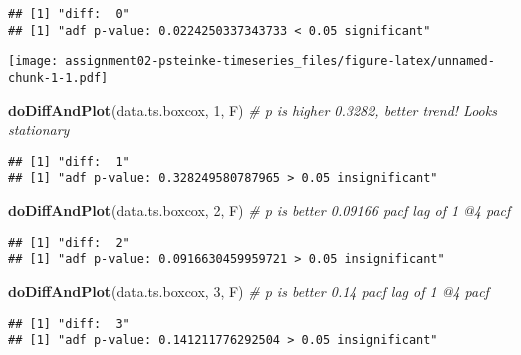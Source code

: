 \documentclass[]{article}
\newenvironment{Shaded}{\begin{snugshade}}{\end{snugshade}}
\newcommand{\CommentTok}[1]{\textcolor[rgb]{0.56,0.35,0.01}{\textit{#1}}}
\newcommand{\DecValTok}[1]{\textcolor[rgb]{0.00,0.00,0.81}{#1}}
\newcommand{\KeywordTok}[1]{\textcolor[rgb]{0.13,0.29,0.53}{\textbf{#1}}}
\newcommand{\NormalTok}[1]{#1}
\newcommand{\OperatorTok}[1]{\textcolor[rgb]{0.81,0.36,0.00}{\textbf{#1}}}
\newcommand{\StringTok}[1]{\textcolor[rgb]{0.31,0.60,0.02}{#1}}
\begin{document}
\begin{verbatim}
## [1] "diff:  0"
## [1] "adf p-value: 0.0224250337343733 < 0.05 significant"
\end{verbatim}

\texttt{[image: assignment02-psteinke-timeseries\_files/figure-latex/unnamed-chunk-1-1.pdf]}

\begin{Shaded}
\begin{Highlighting}[]
\KeywordTok{doDiffAndPlot}\NormalTok{(data.ts.boxcox, }\DecValTok{1}\NormalTok{, F) }\CommentTok{# p is higher 0.3282, better trend! Looks stationary}
\end{Highlighting}
\end{Shaded}

\begin{verbatim}
## [1] "diff:  1"
## [1] "adf p-value: 0.328249580787965 > 0.05 insignificant"
\end{verbatim}

\begin{Shaded}
\begin{Highlighting}[]
\KeywordTok{doDiffAndPlot}\NormalTok{(data.ts.boxcox, }\DecValTok{2}\NormalTok{, F) }\CommentTok{# p is better 0.09166 pacf lag of 1 @4 pacf}
\end{Highlighting}
\end{Shaded}

\begin{verbatim}
## [1] "diff:  2"
## [1] "adf p-value: 0.0916630459959721 > 0.05 insignificant"
\end{verbatim}

\begin{Shaded}
\begin{Highlighting}[]
\KeywordTok{doDiffAndPlot}\NormalTok{(data.ts.boxcox, }\DecValTok{3}\NormalTok{, F) }\CommentTok{# p is better 0.14 pacf lag of 1 @4 pacf}
\end{Highlighting}
\end{Shaded}

\begin{verbatim}
## [1] "diff:  3"
## [1] "adf p-value: 0.141211776292504 > 0.05 insignificant"
\end{verbatim}

\begin{Shaded}
\end{Shaded}
\end{document}

